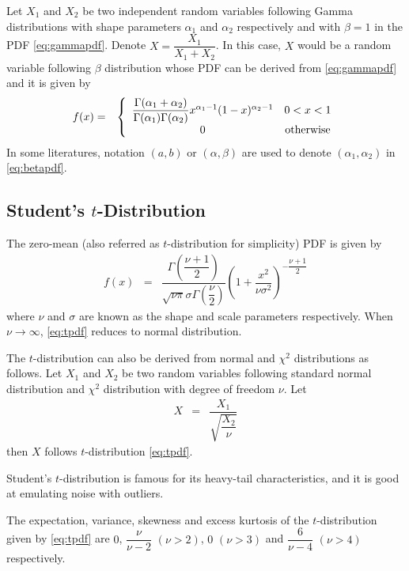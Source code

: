 Let $X_1$ and $X_2$ be two independent random variables following Gamma distributions with shape parameters $\alpha_1$ and $\alpha_2$ respectively and with $\beta = 1$ in the PDF \eqref{eq:gammapdf}. Denote $X=\dfrac{X_1}{X_1+X_2}$. In this case, $X$ would be a random variable following $\beta$ distribution whose PDF can be derived from \eqref{eq:gammapdf} and it is given by
\begin{eqnarray}
  f(x) &=& \left\{\begin{array}{cc}
                    \dfrac{\Gamma(\alpha_1 + \alpha_2)}{\Gamma(\alpha_1)\Gamma(\alpha_2)}x^{\alpha_1-1}(1-x)^{\alpha_2-1} & 0 < x < 1 \\
                    0 & \textup{otherwise}
                  \end{array}\right. \label{eq:betapdf}
\end{eqnarray}
In some literatures, notation $(a, b)$ or $(\alpha, \beta)$ are used to denote $(\alpha_1, \alpha_2)$ in \eqref{eq:betapdf}.

\subsection{Student's $t$-Distribution}

The zero-mean  (also referred as $t$-distribution for simplicity) PDF is given by
\begin{eqnarray}
	f(x) &=& \dfrac{\Gamma\left(\dfrac{\nu+1}{2}\right)}{\sqrt{\nu\pi}\sigma\Gamma\left(\dfrac{\nu}{2}\right)}\left(1+\dfrac{x^2}{\nu\sigma^2}\right)^{-\dfrac{\nu+1}{2}} \label{eq:tpdf}
\end{eqnarray}
where $\nu$ and $\sigma$ are known as the shape and scale parameters respectively. When $\nu\rightarrow\infty$, \eqref{eq:tpdf} reduces to normal distribution. 

The $t$-distribution can also be derived from normal and $\chi^2$ distributions as follows. Let $X_1$ and $X_2$ be two random variables following standard normal distribution and $\chi^2$ distribution with degree of freedom $\nu$. Let
\begin{eqnarray}
	X &=& \dfrac{X_1}{\sqrt{\dfrac{X_2}{\nu}}} \nonumber
\end{eqnarray}
then $X$ follows $t$-distribution \eqref{eq:tpdf}.

Student's $t$-distribution is famous for its heavy-tail characteristics, and it is good at emulating noise with outliers.

The expectation, variance, skewness and excess kurtosis of the $t$-distribution given by \eqref{eq:tpdf} are $0$, $\dfrac{\nu}{\nu-2}$ $(\nu>2)$, $0$ $(\nu>3)$ and $\dfrac{6}{\nu-4}$ $(\nu>4)$ respectively.

